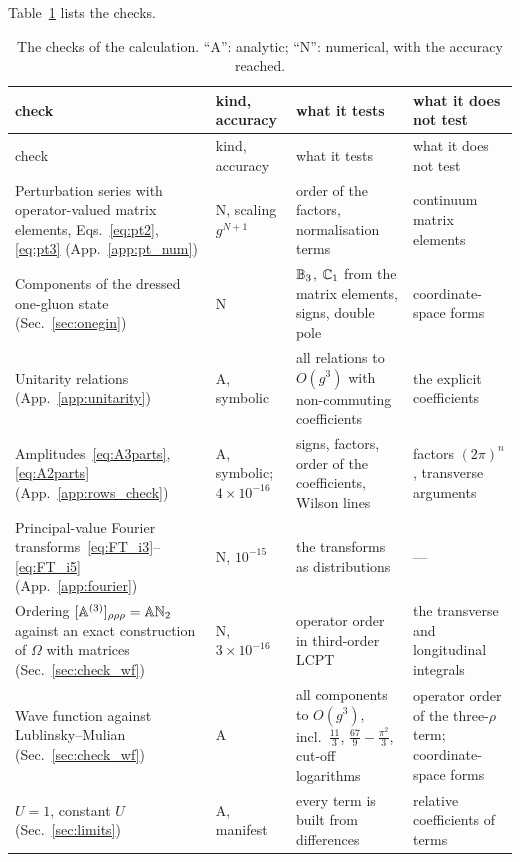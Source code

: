 Table~\ref{tab:checks} lists the checks.
\begingroup
\footnotesize
\renewcommand{\arraystretch}{1.25}
\begin{longtable}{@{}>{\raggedright\arraybackslash}p{}>{\raggedright\arraybackslash}p{}>{\raggedright\arraybackslash}p{}>{\raggedright\arraybackslash}p{}@{}}
\caption{The checks of the calculation. ``A'': analytic; ``N'': numerical, with the accuracy reached.}\label{tab:checks}\\
\toprule
check & kind, accuracy & what it tests & what it does not test\\
\midrule
\endfirsthead
\toprule
check & kind, accuracy & what it tests & what it does not test\\
\midrule
\endhead
\bottomrule
\endfoot
Perturbation series with operator-valued matrix elements, Eqs.~\eqref{eq:pt2}, \eqref{eq:pt3} (App.~\ref{app:pt_num}) & N, scaling $g^{N+1}$ & order of the factors, normalisation terms & continuum matrix elements\\
Components of the dressed one-gluon state (Sec.~\ref{sec:onegin}) & N & $\mathbb{B}_3$, $\mathbb{C}_1$ from the matrix elements, signs, double pole & coordinate-space forms\\
Unitarity relations (App.~\ref{app:unitarity}) & A, symbolic & all relations to $O(g^3)$ with non-commuting coefficients & the explicit coefficients\\
Amplitudes~\eqref{eq:A3parts}, \eqref{eq:A2parts} (App.~\ref{app:rows_check}) & A, symbolic; $4\times10^{-16}$ & signs, factors, order of the coefficients, Wilson lines & factors $(2\pi)^n$, transverse arguments\\
Principal-value Fourier transforms~\eqref{eq:FT_i3}--\eqref{eq:FT_i5} (App.~\ref{app:fourier}) & N, $10^{-15}$ & the transforms as distributions & ---\\
Ordering $[\mathbb{A}^{(3)}]_{\rho\rho\rho}=\mathbb{A}\mathbb{N}_2$ against an exact construction of $\Omega$ with matrices (Sec.~\ref{sec:check_wf}) & N, $3\times10^{-16}$ & operator order in third-order LCPT & the transverse and longitudinal integrals\\
Wave function against Lublinsky--Mulian (Sec.~\ref{sec:check_wf}) & A & all components to $O(g^3)$, incl.\ $\frac{11}{3}$, $\frac{67}{9}-\frac{\pi^2}{3}$, cut-off logarithms & operator order of the three-$\rho$ term; coordinate-space forms\\
$U=1$, constant $U$ (Sec.~\ref{sec:limits}) & A, manifest & every term is built from differences & relative coefficients of terms\\

\end{longtable}
